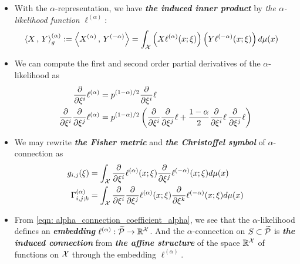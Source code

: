 \documentclass[11pt]{article}
\begin{document}
\begin{itemize}
\item  \begin{definition}
With the $\alpha$-representation, we have \emph{\textbf{the induced inner product}} by \emph{the $\alpha$-likelihood function} $\ell^{(\alpha)}$:
\begin{align}
\left\langle X\,,\, Y \right\rangle_{g}^{(\alpha)} &:= \left\langle X^{(\alpha)}\,,\, Y^{(-\alpha)} \right\rangle =  \int_{{\mathcal X}}\left(X\ell^{(\alpha)}(x; \xi)\right) \left(Y\ell^{(-\alpha)}(x; \xi)\right)d\mu(x) \label{eqn: alpha_inner_product}
\end{align}
\end{definition}

\item We can compute the first and second order partial derivatives of the $\alpha$-likelihood as
\begin{align}
\frac{\partial }{ \partial \xi^i}\ell^{(\alpha)} &= p^{(1-\alpha)/2}\frac{\partial }{ \partial \xi^i}\ell \label{eqn: alpha_likelihood_derivative}\\
\frac{\partial }{ \partial \xi^i}\frac{\partial }{ \partial \xi^j}\ell^{(\alpha)} &= p^{(1-\alpha)/2}\left(\frac{\partial }{ \partial \xi^i}\frac{\partial }{ \partial \xi^j}\ell + \frac{1 - \alpha}{2} \frac{\partial }{ \partial \xi^i}\ell\, \frac{\partial }{ \partial \xi^j}\ell \right) \label{eqn: alpha_likelihood_2nd_derivative}
\end{align}

\item We may rewrite \emph{\textbf{the Fisher metric}} and \emph{\textbf{the Christoffel symbol}} of $\alpha$-connection as
\begin{align}
g_{i,j}(\xi) &= \int_{{\mathcal X}}\frac{\partial }{ \partial \xi^i}\ell^{(\alpha)}(x; \xi) \frac{\partial }{ \partial \xi^j}\ell^{(-\alpha)}(x; \xi)d\mu(x) \label{eqn: fisher_metric_alpha} \\
\Gamma^{(\alpha)}_{i,j;k} &= \int_{{\mathcal X}}\frac{\partial }{ \partial \xi^i}\frac{\partial }{ \partial \xi^j}\ell^{(\alpha)}(x; \xi) \frac{\partial }{ \partial \xi^k}\ell^{(-\alpha)}(x; \xi)d\mu(x) \label{eqn: alpha_connection_coefficient_alpha}
\end{align}

\item \begin{remark}
From \eqref{eqn: alpha_connection_coefficient_alpha}, we see that the $\alpha$-likelihood defines an \emph{\textbf{embedding}} $\ell^{(\alpha)}: \widetilde{{\mathcal P}} \rightarrow {\mathbb R}^{{\mathcal X}}$. And the $\alpha$-connection on $S \subset \widetilde{{\mathcal P}}$ is \emph{\textbf{the induced connection}} from \emph{\textbf{the affine structure}} of the space ${\mathbb R}^{{\mathcal X}}$ of functions on ${\mathcal X}$  through the embedding $\ell^{(\alpha)}$.
\end{remark}


\end{itemize}
\end{document}
